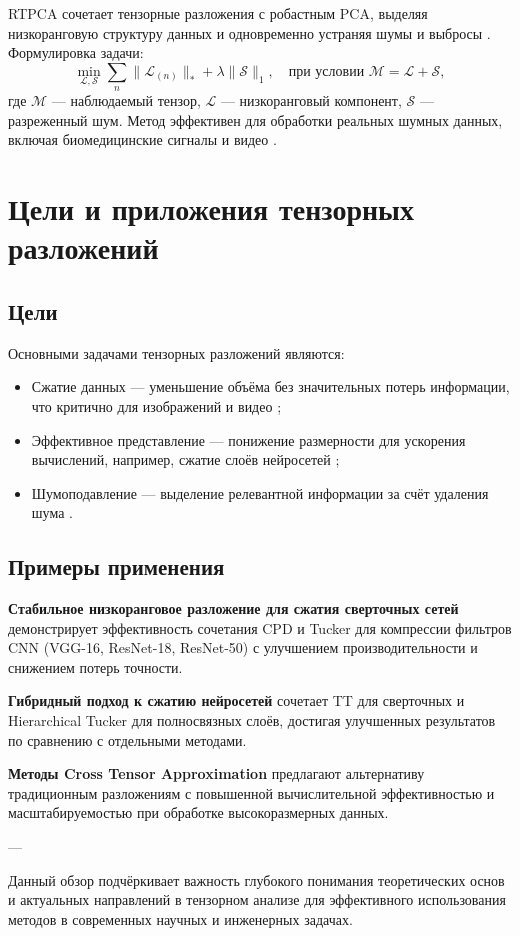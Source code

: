 RTPCA сочетает тензорные разложения с робастным PCA, выделяя низкоранговую структуру данных и одновременно устраняя шумы и выбросы \cite{rtpca_method}. Формулировка задачи:
\[
\min_{\mathcal{L}, \mathcal{S}} \sum_n \|\mathcal{L}_{(n)}\|_* + \lambda \|\mathcal{S}\|_1, \quad \text{при условии } \mathcal{M} = \mathcal{L} + \mathcal{S},
\]
где \(\mathcal{M}\) — наблюдаемый тензор, \(\mathcal{L}\) — низкоранговый компонент, \(\mathcal{S}\) — разреженный шум. Метод эффективен для обработки реальных шумных данных, включая биомедицинские сигналы и видео \cite{rtpca_method}.

\section{Цели и приложения тензорных разложений}
\label{sec:lr_tensor_decomposition_objectives_and_applications}

\subsection*{Цели}
\label{subsec:lr_tensor_decomposition_objectives}

Основными задачами тензорных разложений являются:
\begin{itemize}
    \item Сжатие данных — уменьшение объёма без значительных потерь информации, что критично для изображений и видео \cite{tensor_computation_for_data_analysis};
    \item Эффективное представление — понижение размерности для ускорения вычислений, например, сжатие слоёв нейросетей \cite{stable_low_rank_tensor_decomposition};
    \item Шумоподавление — выделение релевантной информации за счёт удаления шума \cite{tensor_computation_for_data_analysis}.
\end{itemize}

\subsection*{Примеры применения}

\textbf{Стабильное низкоранговое разложение для сжатия сверточных сетей} \cite{stable_low_rank_tensor_decomposition} демонстрирует эффективность сочетания CPD и Tucker для компрессии фильтров CNN (VGG-16, ResNet-18, ResNet-50) с улучшением производительности и снижением потерь точности.

\textbf{Гибридный подход к сжатию нейросетей} \cite{hybrid_tensor_decomposition_c_nn} сочетает TT для сверточных и Hierarchical Tucker для полносвязных слоёв, достигая улучшенных результатов по сравнению с отдельными методами.

\textbf{Методы Cross Tensor Approximation} \cite{cross_tensor_approximation} предлагают альтернативу традиционным разложениям с повышенной вычислительной эффективностью и масштабируемостью при обработке высокоразмерных данных.

---

Данный обзор подчёркивает важность глубокого понимания теоретических основ и актуальных направлений в тензорном анализе для эффективного использования методов в современных научных и инженерных задачах.
